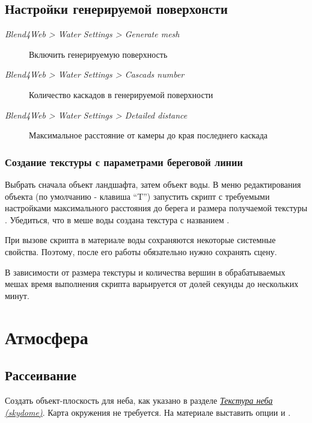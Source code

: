 \documentclass[a4paper,12pt,oneside]{sphinxmanual}
\begin{document}
\subsection{Настройки генерируемой поверхонсти}
\label{outdoor_rendering:id23}\begin{description}
\item[{\emph{Blend4Web \textgreater{} Water Settings \textgreater{} Generate mesh}}] \leavevmode
Включить генерируемую поверхность

\item[{\emph{Blend4Web \textgreater{} Water Settings \textgreater{} Cascads number}}] \leavevmode
Количество каскадов в генерируемой поверхности

\item[{\emph{Blend4Web \textgreater{} Water Settings \textgreater{} Detailed distance}}] \leavevmode
Максимальное расстояние от камеры до края последнего каскада

\end{description}


\subsubsection{Создание текстуры с параметрами береговой линии}
\label{outdoor_rendering:index-0}\label{outdoor_rendering:id24}\label{outdoor_rendering:shore-distance-bake}
Выбрать сначала объект ландшафта, затем объект воды. В меню редактирования объекта (по умолчанию - клавиша ``T'') запустить скрипт  с требуемыми настройками максимального расстояния до берега  и размера получаемой текстуры . Убедиться, что в меше воды создана текстура с названием .

При вызове скрипта в материале воды сохраняются некоторые системные свойства. Поэтому, после его работы обязательно нужно сохранять сцену.

В зависимости от размера текстуры и количества вершин в обрабатываемых мешах время выполнения скрипта варьируется от долей секунды до нескольких минут.


\section{Атмосфера}
\label{outdoor_rendering:id25}

\subsection{Рассеивание}
\label{outdoor_rendering:id26}
Создать объект-плоскость для неба, как указано в разделе {\hyperref[textures:skydome-texture]{\emph{Текстура неба (skydome)}}}. Карта окружения не требуется. На материале выставить опции  и .
\end{document}
